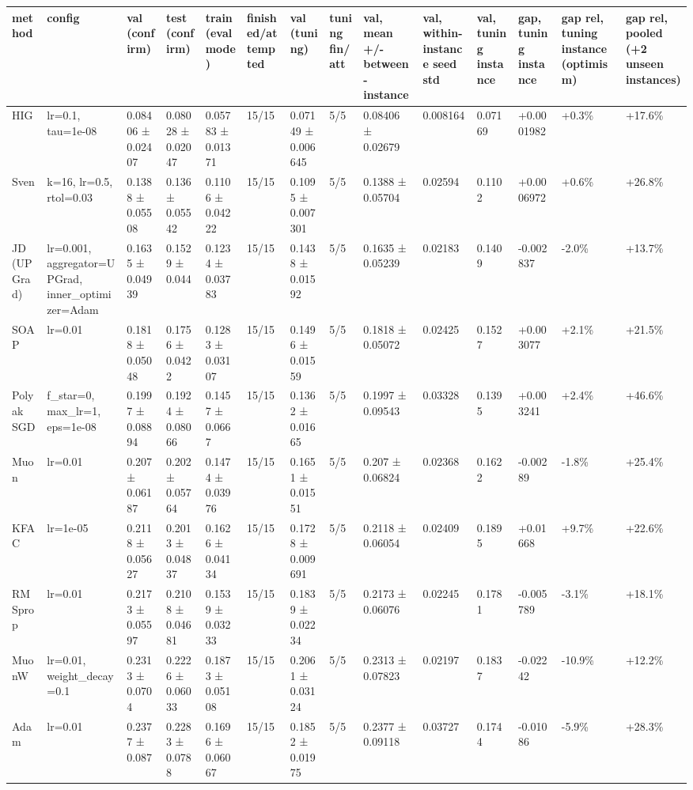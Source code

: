 \begin{tabular}{llllllllllllll}
\toprule
method & config & val (confirm) & test (confirm) & train (eval mode) & finished/attempted & val (tuning) & tuning fin/att & val, mean +/- between-instance & val, within-instance seed std & val, tuning instance & gap, tuning instance & gap rel, tuning instance (optimism) & gap rel, pooled (+2 unseen instances) \\
\midrule
HIG & lr=0.1, tau=1e-08 & 0.08406 ± 0.02407 & 0.08028 ± 0.02047 & 0.05783 ± 0.01371 & 15/15 & 0.07149 ± 0.006645 & 5/5 & 0.08406 ± 0.02679 & 0.008164 & 0.07169 & +0.0001982 & +0.3\% & +17.6\% \\
Sven & k=16, lr=0.5, rtol=0.03 & 0.1388 ± 0.05508 & 0.136 ± 0.05542 & 0.1106 ± 0.04222 & 15/15 & 0.1095 ± 0.007301 & 5/5 & 0.1388 ± 0.05704 & 0.02594 & 0.1102 & +0.0006972 & +0.6\% & +26.8\% \\
JD (UPGrad) & lr=0.001, aggregator=UPGrad, inner\_optimizer=Adam & 0.1635 ± 0.04939 & 0.1529 ± 0.044 & 0.1234 ± 0.03783 & 15/15 & 0.1438 ± 0.01592 & 5/5 & 0.1635 ± 0.05239 & 0.02183 & 0.1409 & -0.002837 & -2.0\% & +13.7\% \\
SOAP & lr=0.01 & 0.1818 ± 0.05048 & 0.1756 ± 0.0422 & 0.1283 ± 0.03107 & 15/15 & 0.1496 ± 0.01559 & 5/5 & 0.1818 ± 0.05072 & 0.02425 & 0.1527 & +0.003077 & +2.1\% & +21.5\% \\
Polyak SGD & f\_star=0, max\_lr=1, eps=1e-08 & 0.1997 ± 0.08894 & 0.1924 ± 0.08066 & 0.1457 ± 0.0667 & 15/15 & 0.1362 ± 0.01665 & 5/5 & 0.1997 ± 0.09543 & 0.03328 & 0.1395 & +0.003241 & +2.4\% & +46.6\% \\
Muon & lr=0.01 & 0.207 ± 0.06187 & 0.202 ± 0.05764 & 0.1474 ± 0.03976 & 15/15 & 0.1651 ± 0.01551 & 5/5 & 0.207 ± 0.06824 & 0.02368 & 0.1622 & -0.00289 & -1.8\% & +25.4\% \\
KFAC & lr=1e-05 & 0.2118 ± 0.05627 & 0.2013 ± 0.04837 & 0.1626 ± 0.04134 & 15/15 & 0.1728 ± 0.009691 & 5/5 & 0.2118 ± 0.06054 & 0.02409 & 0.1895 & +0.01668 & +9.7\% & +22.6\% \\
RMSprop & lr=0.01 & 0.2173 ± 0.05597 & 0.2108 ± 0.04681 & 0.1539 ± 0.03233 & 15/15 & 0.1839 ± 0.02234 & 5/5 & 0.2173 ± 0.06076 & 0.02245 & 0.1781 & -0.005789 & -3.1\% & +18.1\% \\
MuonW & lr=0.01, weight\_decay=0.1 & 0.2313 ± 0.0704 & 0.2226 ± 0.06033 & 0.1873 ± 0.05108 & 15/15 & 0.2061 ± 0.03124 & 5/5 & 0.2313 ± 0.07823 & 0.02197 & 0.1837 & -0.02242 & -10.9\% & +12.2\% \\
Adam & lr=0.01 & 0.2377 ± 0.087 & 0.2283 ± 0.0788 & 0.1696 ± 0.06067 & 15/15 & 0.1852 ± 0.01975 & 5/5 & 0.2377 ± 0.09118 & 0.03727 & 0.1744 & -0.01086 & -5.9\% & +28.3\% \\

\end{tabular}
